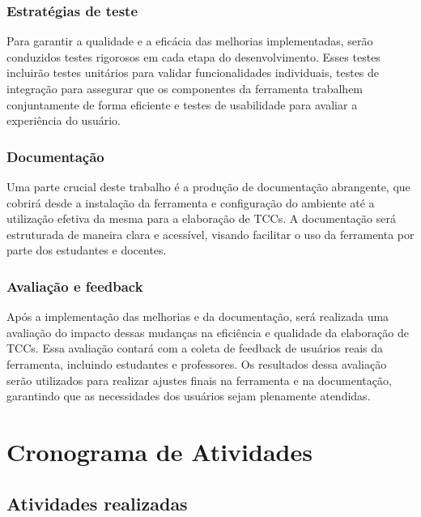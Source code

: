\documentclass[
	12pt,				%
	oneside,			%
	a4paper,			%
	english,			%
	french,				%
	spanish,			%
	brazil				%
	]{abntex2}
\begin{document}
\hypertarget{estratuxe9gias-de-teste}{%
\subsection{Estratégias de teste}\label{estratuxe9gias-de-teste}}

Para garantir a qualidade e a eficácia das melhorias implementadas,
serão conduzidos testes rigorosos em cada etapa do desenvolvimento.
Esses testes incluirão testes unitários para validar funcionalidades
individuais, testes de integração para assegurar que os componentes da
ferramenta trabalhem conjuntamente de forma eficiente e testes de
usabilidade para avaliar a experiência do usuário.

\hypertarget{documentauxe7uxe3o}{%
\subsection{Documentação}\label{documentauxe7uxe3o}}

Uma parte crucial deste trabalho é a produção de documentação
abrangente, que cobrirá desde a instalação da ferramenta e configuração
do ambiente até a utilização efetiva da mesma para a elaboração de TCCs.
A documentação será estruturada de maneira clara e acessível, visando
facilitar o uso da ferramenta por parte dos estudantes e docentes.

\hypertarget{avaliauxe7uxe3o-e-feedback}{%
\subsection{Avaliação e feedback}\label{avaliauxe7uxe3o-e-feedback}}

Após a implementação das melhorias e da documentação, será realizada uma
avaliação do impacto dessas mudanças na eficiência e qualidade da
elaboração de TCCs. Essa avaliação contará com a coleta de feedback de
usuários reais da ferramenta, incluindo estudantes e professores. Os
resultados dessa avaliação serão utilizados para realizar ajustes finais
na ferramenta e na documentação, garantindo que as necessidades dos
usuários sejam plenamente atendidas.

\hypertarget{cronograma-de-atividades}{%
\chapter{Cronograma de Atividades}\label{cronograma-de-atividades}}

\hypertarget{atividades-realizadas}{%
\section{Atividades realizadas}\label{atividades-realizadas}}
\end{document}
